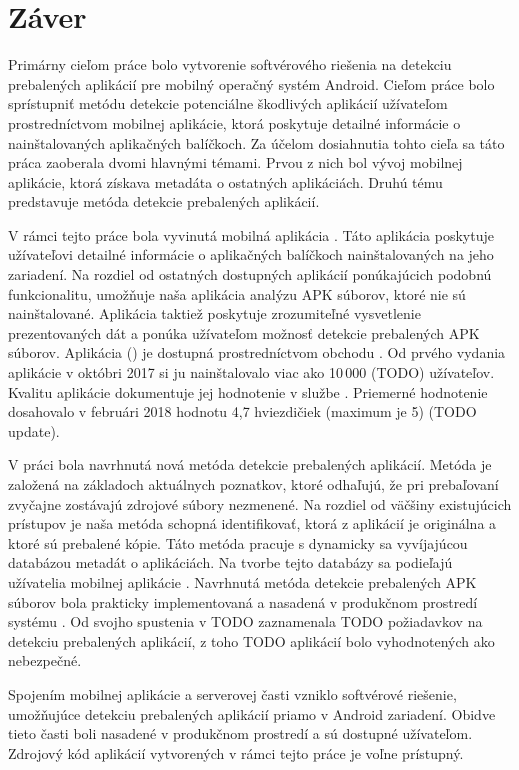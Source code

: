 \chapter{Záver}
Primárny cieľom práce bolo vytvorenie softvérového riešenia na detekciu prebalených aplikácií pre mobilný operačný systém Android. Cieľom práce bolo sprístupniť metódu detekcie potenciálne škodlivých aplikácií užívateľom prostredníctvom mobilnej aplikácie, ktorá poskytuje detailné informácie o nainštalovaných aplikačných balíčkoch.  
Za účelom dosiahnutia tohto cieľa sa táto práca zaoberala dvomi hlavnými témami. Prvou z nich bol vývoj mobilnej aplikácie, ktorá získava metadáta o ostatných aplikáciách. Druhú tému predstavuje metóda detekcie prebalených aplikácií. 

V rámci tejto práce bola vyvinutá mobilná aplikácia . Táto aplikácia poskytuje užívateľovi detailné informácie o aplikačných balíčkoch nainštalovaných na jeho zariadení. Na rozdiel od ostatných dostupných aplikácií ponúkajúcich podobnú funkcionalitu, umožňuje naša aplikácia analýzu APK súborov, ktoré nie sú nainštalované. Aplikácia taktiež poskytuje zrozumiteľné vysvetlenie prezentovaných dát a ponúka užívateľom možnosť detekcie prebalených APK súborov. Aplikácia  () je dostupná prostredníctvom obchodu . Od prvého vydania aplikácie v októbri 2017 si ju nainštalovalo viac ako 10\,000 (TODO) užívateľov. Kvalitu aplikácie dokumentuje jej hodnotenie v službe . Priemerné hodnotenie dosahovalo v februári 2018 hodnotu 4,7 hviezdičiek (maximum je 5) (TODO update).

V práci bola navrhnutá nová metóda detekcie prebalených aplikácií. Metóda je založená na základoch aktuálnych poznatkov, ktoré odhaľujú, že pri prebaľovaní zvyčajne zostávajú zdrojové súbory nezmenené. Na rozdiel od väčšiny existujúcich prístupov je naša metóda schopná identifikovať, ktorá z aplikácií je originálna a ktoré sú prebalené kópie. Táto metóda pracuje s dynamicky sa vyvíjajúcou databázou metadát o aplikáciách. Na tvorbe tejto databázy sa podieľajú užívatelia mobilnej aplikácie . Navrhnutá metóda detekcie prebalených APK súborov bola prakticky implementovaná a nasadená v produkčnom prostredí systému . Od svojho spustenia v TODO zaznamenala TODO požiadavkov na detekciu prebalených aplikácií, z toho TODO aplikácií bolo vyhodnotených ako nebezpečné.


Spojením mobilnej aplikácie a serverovej časti vzniklo softvérové riešenie, umožňujúce detekciu prebalených aplikácií priamo v Android zariadení. Obidve tieto časti boli nasadené v produkčnom prostredí a sú dostupné užívateľom. Zdrojový kód aplikácií vytvorených v rámci tejto práce je voľne prístupný.
